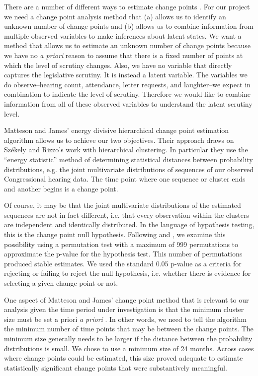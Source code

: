\documentclass[a4paper]{article}\usepackage[]{graphicx}\usepackage[]{color}
\begin{document}
There are a number of different ways to estimate change points \cite[see][]{Killick2013,Matteson2014}. For our project we need a change point analysis method that (a) allows us to identify an unknown number of change points and (b) allows us to combine information from multiple observed variables to make inferences about latent states. We want a method that allows us to estimate an unknown number of change points because we have no \emph{a priori} reason to assume that there is a fixed number of points at which the level of scrutiny changes. Also, we have no variable that directly captures the legislative scrutiny. It is instead a latent variable. The variables we do observe--hearing count, attendance, letter requests, and laughter--we expect in combination to indicate the level of scrutiny. Therefore we would like to combine information from all of these observed variables to understand the latent scrutiny level.

Matteson and James' \citeyearpar{Matteson2014} energy divisive hierarchical change point estimation algorithm allows us to achieve our two objectives. Their approach draws on Sz{\'e}kely and Rizzo's \citeyearpar{Szekely2005} work with hierarchical clustering. In particular they use the ``energy statistic'' method of determining statistical distances between probability distributions, e.g. the joint multivariate distributions of sequences of our observed Congressional hearing data. The time point where one sequence or cluster ends and another begins is a change point.

Of course, it may be that the joint multivariate distributions of the estimated sequences are not in fact different, i.e. that every observation within the clusters are independent and identically distributed. In the language of hypothesis testing, this is the change point null hypothesis. Following \cite{Matteson2014} and \cite{Rizzo2010}, we examine this possibility using a permutation test with a maximum of 999 permutations to approximate the p-value for the hypothesis test. This number of permutations produced stable estimates. We used the standard 0.05 p-value as a criteria for rejecting or failing to reject the null hypothesis, i.e. whether there is evidence for selecting a given change point or not.

One aspect of Matteson and James' change point method that is relevant to our analysis given the time period under investigation is that the minimum cluster size must be set a priori \emph{a priori} \citeyearpar[337]{Matteson2014}. In other words, we need to tell the algorithm the minimum number of time points that may be between the change points. The minimum size generally needs to be larger if the distance between the probability distributions is small. We chose to use a minimum size of 24 months. Across cases where change points could be estimated, this size proved adequate to estimate statistically significant change points that were substantively meaningful.
\end{document}
